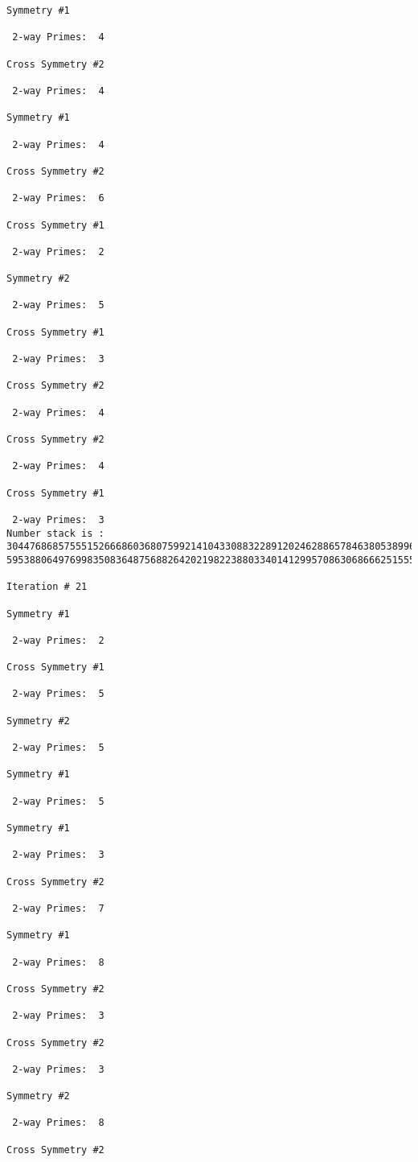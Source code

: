 {{{{\begin{verbatim}
Symmetry #1

 2-way Primes: 	4

Cross Symmetry #2

 2-way Primes: 	4

Symmetry #1

 2-way Primes: 	4

Cross Symmetry #2

 2-way Primes: 	6

Cross Symmetry #1

 2-way Primes: 	2

Symmetry #2

 2-way Primes: 	5

Cross Symmetry #1

 2-way Primes: 	3

Cross Symmetry #2

 2-way Primes: 	4

Cross Symmetry #2

 2-way Primes: 	4

Cross Symmetry #1

 2-way Primes: 	3
Number stack is :
30447686857555152666860368075992141043308832289120246288657846380538996794608835958544046240163340857
59538806497699835083648756882642021982238803340141299570863068666251555758686744037580433610426404458

Iteration #	21

Symmetry #1

 2-way Primes: 	2

Cross Symmetry #1

 2-way Primes: 	5

Symmetry #2

 2-way Primes: 	5

Symmetry #1

 2-way Primes: 	5

Symmetry #1

 2-way Primes: 	3

Cross Symmetry #2

 2-way Primes: 	7

Symmetry #1

 2-way Primes: 	8

Cross Symmetry #2

 2-way Primes: 	3

Cross Symmetry #2

 2-way Primes: 	3

Symmetry #2

 2-way Primes: 	8

Cross Symmetry #2


\end{verbatim}}}}}
